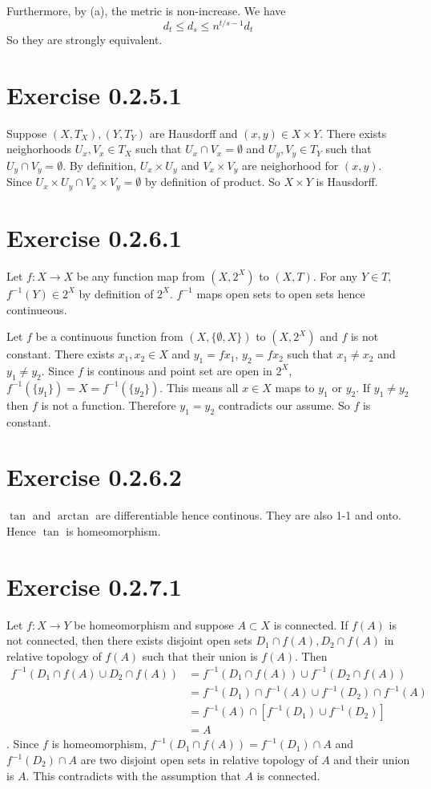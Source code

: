 \documentclass[12pt]{article}
\begin{document}
Furthermore, by (a), the metric is non-increase. We have 
$$ d_t \leq d_s \leq n^{t/s -1} d_t$$
So they are strongly equivalent. \QED

\section*{Exercise 0.2.5.1}
Suppose $(X, T_X), (Y, T_Y)$ are Hausdorff and $(x,y) \in X \times Y$. There exists neighorhoods $U_x, V_x \in T_X$ such that $U_x \cap V_x = \emptyset$ and $U_y, V_y \in T_Y$ such that $U_y \cap V_y = \emptyset$. By definition, $U_x \times U_y$ and $V_x \times V_y$ are neighorhood for $(x,y)$. Since $U_x \times U_y \cap V_x \times V_y = \emptyset$ by definition of product. So $X \times Y$ is Hausdorff. \QED

\section*{Exercise 0.2.6.1}
Let $f: X \rightarrow X$ be any function map from $(X, 2^X)$ to $(X, T)$. For any $Y \in T$, $f^{-1}(Y) \in 2^X$ by definition of $2^X$. $f^{-1}$ maps open sets to open sets hence continueous. \QED

Let $f$ be a continuous function from $(X, \{\emptyset, X\})$ to  $(X, 2^X)$ and $f$ is not constant. There exists $x_1, x_2 \in X$ and $y_1=fx_1$, $y_2=fx_2$ such that $x_1 \neq x_2$ and $y_1 \neq y_2$. Since $f$ is continous and point set are open in $2^X$, $f^{-1}(\{y_1\}) = X = f^{-1}(\{y_2\})$. This means all $x \in X$ maps to $y_1$ or $y_2$. If $y_1 \neq y_2$ then $f$ is not a function. Therefore $y_1 = y_2$ contradicts our assume. So $f$ is constant. \QED

\section*{Exercise 0.2.6.2}
$\tan$ and $\arctan$ are differentiable hence continous. They are also 1-1 and onto. Hence $\tan$ is homeomorphism.

\section*{Exercise 0.2.7.1}
Let $f: X \rightarrow Y$ be homeomorphism and suppose $A \subset X$ is connected. If $f(A)$ is not connected, then there exists disjoint open sets $D_1 \cap f(A), D_2 \cap f(A)$ in relative topology of $f(A)$ such that their union is $f(A)$. Then $$ \begin{aligned}
	f^{-1}(D_1 \cap f(A) \cup D_2 \cap f(A)) &= f^{-1}(D_1 \cap f(A)) \cup f^{-1}(D_2 \cap f(A)) \\
	&= f^{-1}(D_1)\cap f^{-1}(A) \cup f^{-1}(D_2)\cap f^{-1}(A) \\
	&= f^{-1}(A) \cap \left[ f^{-1}(D_1)\cup f^{-1}(D_2) \right] \\
	&= A
\end{aligned}$$. Since $f$ is homeomorphism, $ f^{-1}(D_1 \cap f(A)) = f^{-1}(D_1)\cap A$ and $f^{-1}(D_2) \cap A$ are two disjoint open sets in relative topology of $A$ and their union is $A$. This contradicts with the assumption that $A$ is connected. \QED
\end{document}
